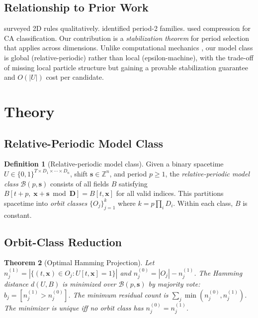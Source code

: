 \documentclass[letterpaper]{article}
\newtheorem{theorem}{Theorem}
\theoremstyle{definition}
\newtheorem{definition}[theorem]{Definition}
\theoremstyle{remark}
\newcommand{\bs}{\mathbf{s}}
\newcommand{\bD}{\mathbf{D}}
\newcommand{\bx}{\mathbf{x}}
\begin{document}
\subsection{Relationship to Prior Work}

\citet{packard1985} surveyed 2D rules qualitatively.
\citet{boccara1999} identified period-2 families.
\citet{zenil2010} used compression for CA classification.
Our contribution is a \emph{stabilization theorem} for period selection that applies across dimensions.
Unlike computational mechanics \citep{crutchfield1997,rupe2018}, our model class is global (relative-periodic) rather than local (epsilon-machine), with the trade-off of missing local particle structure but gaining a provable stabilization guarantee and $O(|U|)$ cost per candidate.

\section{Theory}

\subsection{Relative-Periodic Model Class}

\begin{definition}[Relative-periodic model class]\label{def:model}
Given a binary spacetime $U \in \{0,1\}^{T \times D_1 \times \cdots \times D_n}$, shift $\bs \in \mathbb{Z}^n$, and period $p \geq 1$, the \emph{relative-periodic model class} $\mathcal{B}(p, \bs)$ consists of all fields $B$ satisfying $B[t {+} p,\; \bx {+} \bs \bmod \bD] = B[t, \bx]$
for all valid indices.
This partitions spacetime into \emph{orbit classes} $\{O_j\}_{j=1}^{k}$ where $k = p \prod_i D_i$.
Within each class, $B$ is constant.
\end{definition}

\subsection{Orbit-Class Reduction}

\begin{theorem}[Optimal Hamming Projection]\label{thm:projection}
Let $n_j^{(1)} = |\{(t,\bx) \in O_j : U[t,\bx] = 1\}|$ and $n_j^{(0)} = |O_j| - n_j^{(1)}$.
The Hamming distance $d(U, B)$ is minimized over $\mathcal{B}(p, \bs)$ by majority vote: $b_j = [n_j^{(1)} > n_j^{(0)}]$.
The minimum residual count is $\sum_j \min(n_j^{(0)}, n_j^{(1)})$.
The minimizer is unique iff no orbit class has $n_j^{(0)} = n_j^{(1)}$.
\end{theorem}
\end{document}

